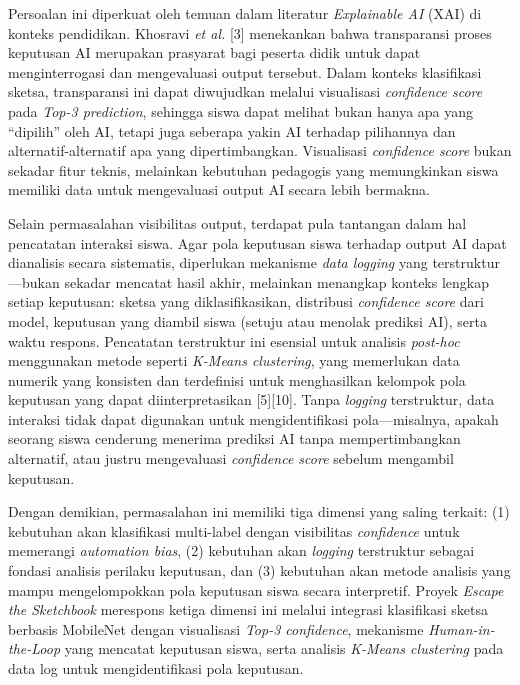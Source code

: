 Persoalan ini diperkuat oleh temuan dalam literatur \textit{Explainable AI} (XAI) di konteks pendidikan. Khosravi \textit{et al.} [3] menekankan bahwa transparansi proses keputusan AI merupakan prasyarat bagi peserta didik untuk dapat menginterrogasi dan mengevaluasi output tersebut. Dalam konteks klasifikasi sketsa, transparansi ini dapat diwujudkan melalui visualisasi \textit{confidence score} pada \textit{Top-3 prediction}, sehingga siswa dapat melihat bukan hanya apa yang ``dipilih'' oleh AI, tetapi juga seberapa yakin AI terhadap pilihannya dan alternatif-alternatif apa yang dipertimbangkan. Visualisasi \textit{confidence score} bukan sekadar fitur teknis, melainkan kebutuhan pedagogis yang memungkinkan siswa memiliki data untuk mengevaluasi output AI secara lebih bermakna.

Selain permasalahan visibilitas output, terdapat pula tantangan dalam hal pencatatan interaksi siswa. Agar pola keputusan siswa terhadap output AI dapat dianalisis secara sistematis, diperlukan mekanisme \textit{data logging} yang terstruktur—bukan sekadar mencatat hasil akhir, melainkan menangkap konteks lengkap setiap keputusan: sketsa yang diklasifikasikan, distribusi \textit{confidence score} dari model, keputusan yang diambil siswa (setuju atau menolak prediksi AI), serta waktu respons. Pencatatan terstruktur ini esensial untuk analisis \textit{post-hoc} menggunakan metode seperti \textit{K-Means clustering}, yang memerlukan data numerik yang konsisten dan terdefinisi untuk menghasilkan kelompok pola keputusan yang dapat diinterpretasikan [5][10]. Tanpa \textit{logging} terstruktur, data interaksi tidak dapat digunakan untuk mengidentifikasi pola—misalnya, apakah seorang siswa cenderung menerima prediksi AI tanpa mempertimbangkan alternatif, atau justru mengevaluasi \textit{confidence score} sebelum mengambil keputusan.

Dengan demikian, permasalahan ini memiliki tiga dimensi yang saling terkait: (1) kebutuhan akan klasifikasi multi-label dengan visibilitas \textit{confidence} untuk memerangi \textit{automation bias}, (2) kebutuhan akan \textit{logging} terstruktur sebagai fondasi analisis perilaku keputusan, dan (3) kebutuhan akan metode analisis yang mampu mengelompokkan pola keputusan siswa secara interpretif. Proyek \textit{Escape the Sketchbook} merespons ketiga dimensi ini melalui integrasi klasifikasi sketsa berbasis MobileNet dengan visualisasi \textit{Top-3 confidence}, mekanisme \textit{Human-in-the-Loop} yang mencatat keputusan siswa, serta analisis \textit{K-Means clustering} pada data log untuk mengidentifikasi pola keputusan.

